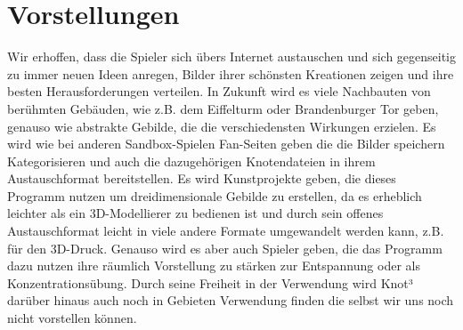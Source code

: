 \clearpage

\section{Vorstellungen}
\label{EF:Vorstellungen}
Wir erhoffen, dass die Spieler sich übers Internet austauschen und sich gegenseitig zu immer neuen Ideen anregen, Bilder ihrer schönsten Kreationen zeigen und ihre besten Herausforderungen verteilen. In Zukunft wird es viele Nachbauten von berühmten Gebäuden, wie z.B. dem Eiffelturm oder Brandenburger Tor geben, genauso wie abstrakte Gebilde, die die verschiedensten Wirkungen erzielen. Es wird wie bei anderen Sandbox-Spielen Fan-Seiten geben die die Bilder speichern Kategorisieren und auch die dazugehörigen Knotendateien in ihrem Austauschformat bereitstellen. Es wird Kunstprojekte geben, die dieses Programm nutzen um dreidimensionale Gebilde zu erstellen, da es erheblich leichter als ein 3D-Modellierer zu bedienen ist und durch sein offenes Austauschformat leicht in viele andere Formate umgewandelt werden kann, z.B. für den 3D-Druck. Genauso wird es aber auch Spieler geben, die das Programm dazu nutzen ihre räumlich Vorstellung zu stärken zur Entspannung oder als Konzentrationsübung.
Durch seine Freiheit in der Verwendung wird Knot³ darüber hinaus auch noch in Gebieten Verwendung finden die selbst wir uns noch nicht vorstellen können.
